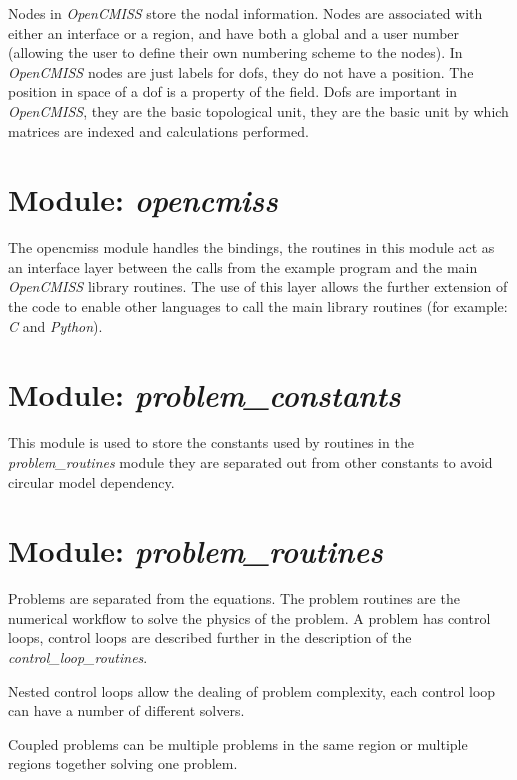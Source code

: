 Nodes in \emph{OpenCMISS} store the nodal information. Nodes are 
associated with either an interface or a region, and have both a global 
and a user number (allowing the user to define their own numbering scheme 
to the nodes). In \emph{OpenCMISS} nodes are just labels for dofs, they 
do not have a position. The position in space of a dof is a property of 
the field. Dofs are important in \emph{OpenCMISS}, they are the basic topological 
unit, they are the basic unit by which matrices are indexed and 
calculations performed.


\section{Module: \emph{opencmiss}}
\label{sec:opencmiss}

The opencmiss module handles the bindings, the routines in this module act as 
an interface layer between the calls from the example program and the main 
\emph{OpenCMISS} library routines. The use of this layer allows the further 
extension of the code to enable other languages to call the main library 
routines (for example: \emph{C} and \emph{Python}).


\section{Module: \emph{problem\_constants}}
\label{sec:problemconstants}

This module is used to store the constants used by routines in the 
\emph{problem\_routines} module they are separated out from other 
constants to avoid circular model dependency.


\section{Module: \emph{problem\_routines}}
\label{sec:problemroutines}

Problems are separated from the equations. The problem routines are the 
numerical workflow to solve the physics of the problem. A problem has control 
loops, control loops are described further in the description of the 
\emph{control\_loop\_routines}.

Nested control loops allow the dealing of problem complexity, each control
loop can have a number of different solvers.

Coupled problems can be multiple problems in the same region or multiple 
regions together solving one problem.


